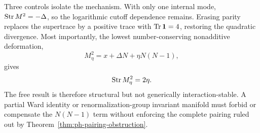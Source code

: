 Three controls isolate the mechanism.  With only one internal mode,
\(\operatorname{Str} M^2=-\Delta\), so the logarithmic cutoff dependence remains.
Erasing parity replaces the supertrace by a positive trace with
\(\operatorname{Tr}\mathbf1=4\), restoring the quadratic divergence.  Most importantly,
the lowest number-conserving nonadditive deformation,
\begin{equation}
 M_\eta^2=x+\Delta N+\eta N(N-1),
 \label{eq:ph-deformation}
\end{equation}
gives
\begin{equation}
 \operatorname{Str} M_\eta^2=2\eta .
 \label{eq:ph-deformation-moment}
\end{equation}
The free result is therefore structural but not generically
interaction-stable.  A partial Ward identity or renormalization-group
invariant manifold must forbid or compensate the \(N(N-1)\) term without
enforcing the complete pairing ruled out by
Theorem~\ref{thm:ph-pairing-obstruction}.

